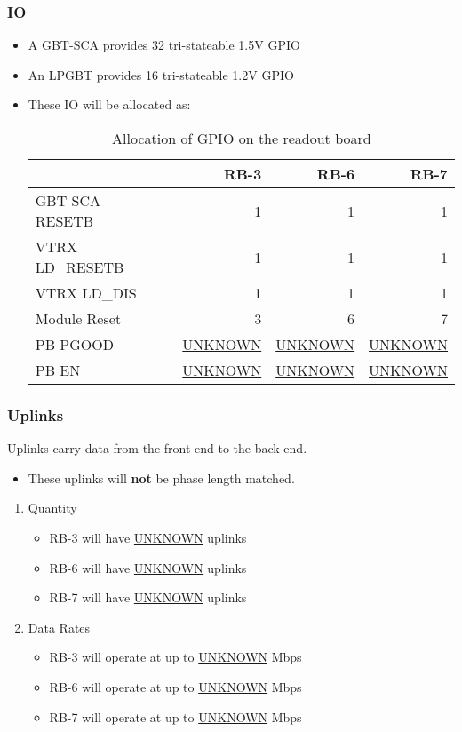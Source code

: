 \documentclass[11pt]{article}
\begin{document}
\subsubsection{IO}
\label{sec:org64b8ad9}
\begin{itemize}
\item A GBT-SCA provides 32 tri-stateable 1.5V GPIO
\item An LPGBT provides 16 tri-stateable 1.2V GPIO
\item These IO will be allocated as:
\begin{table}[htbp]
\caption{Allocation of GPIO on the readout board}
\centering
\begin{tabular}{llrrr}
 &  & RB-3 & RB-6 & RB-7\\
\hline
GBT-SCA RESETB &  & 1 & 1 & 1\\
VTRX LD\_RESETB &  & 1 & 1 & 1\\
VTRX LD\_DIS &  & 1 & 1 & 1\\
Module Reset &  & 3 & 6 & 7\\
PB PGOOD &  & \uline{UNKNOWN} & \uline{UNKNOWN} & \uline{UNKNOWN}\\
PB EN &  & \uline{UNKNOWN} & \uline{UNKNOWN} & \uline{UNKNOWN}\\
\end{tabular}
\end{table}
\end{itemize}

\subsubsection{Uplinks}
\label{sec:org260cfec}

Uplinks carry data from the front-end to the back-end.

\begin{itemize}
\item These uplinks will \textbf{not} be phase length matched.
\end{itemize}

\begin{enumerate}
\item Quantity
\label{sec:orgae384b4}
\begin{itemize}
\item RB-3 will have \uline{UNKNOWN} uplinks
\item RB-6 will have \uline{UNKNOWN} uplinks
\item RB-7 will have \uline{UNKNOWN} uplinks
\end{itemize}
\item Data Rates
\label{sec:org6895a9e}
\begin{itemize}
\item RB-3 will operate at up to \uline{UNKNOWN} Mbps
\item RB-6 will operate at up to \uline{UNKNOWN} Mbps
\item RB-7 will operate at up to \uline{UNKNOWN} Mbps
\end{itemize}
\end{enumerate}
\end{document}

